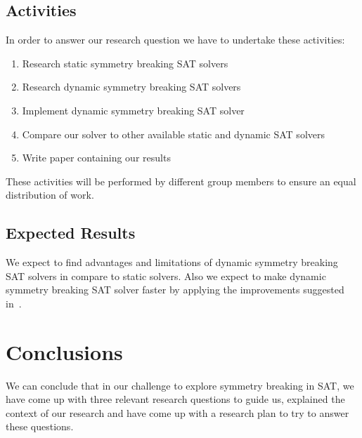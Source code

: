 		\subsection{Activities}
			In order to answer our research question we have to undertake these activities:
	
			\begin{enumerate}
				\item Research static symmetry breaking SAT solvers
				\item Research dynamic symmetry breaking SAT solvers
				\item Implement dynamic symmetry breaking SAT solver
				\item Compare our solver to other available static and dynamic SAT solvers
				\item Write paper containing our results
			\end{enumerate}

			These activities will be performed by different group members to ensure an equal distribution of work.

		\subsection{Expected Results}
			We expect to find advantages and limitations of dynamic symmetry breaking SAT solvers in compare to static solvers.
			Also we expect to make dynamic symmetry breaking SAT solver faster by applying the improvements suggested in~\cite{devriendt2012symmetry}.

	\section{Conclusions}
	We can conclude that in our challenge to explore symmetry breaking in SAT, we have come up with three relevant research questions to guide us, explained the context of our research and have come up with a research plan to try to answer these questions.



